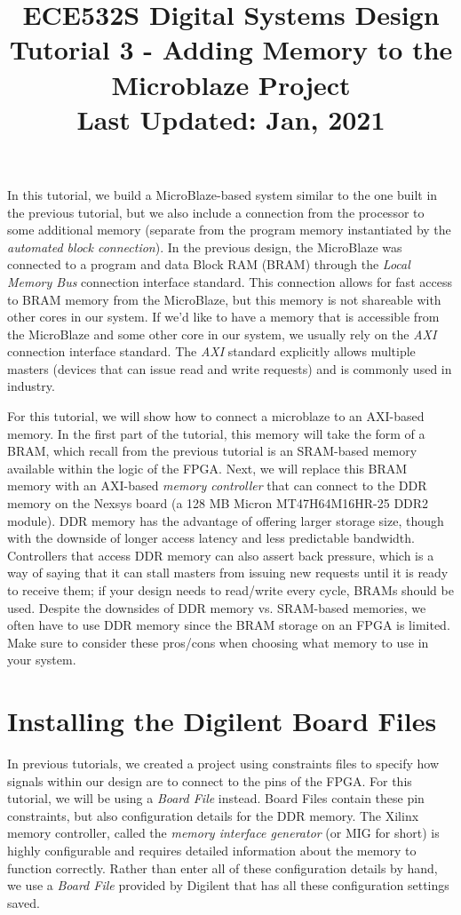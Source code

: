 \documentclass[11pt]{article}
\title{ECE532S Digital Systems Design \\ \vspace{0.4cm}
       \Large Tutorial 3 - Adding Memory to the Microblaze Project \\ \vspace{0.4cm}
       \small Last Updated: Jan, 2021}
\author{ }
\date{ }
\begin{document}
\maketitle
\vspace{-1cm}

In this tutorial, we build a MicroBlaze-based system similar to the one built in the previous tutorial, but we also include a connection from the processor to some additional memory (separate from the program memory instantiated by the \textit{automated block connection}). In the previous design, the MicroBlaze was connected to a program and data Block RAM (BRAM) through the \textit{Local Memory Bus} connection interface standard. This connection allows for fast access to BRAM memory from the MicroBlaze, but this memory is not shareable with other cores in our system. If we'd like to have a memory that is accessible from the MicroBlaze and some other core in our system, we usually rely on the \textit{AXI} connection interface standard. The \textit{AXI} standard explicitly allows multiple masters (devices that can issue read and write requests) and is commonly used in industry.

For this tutorial, we will show how to connect a microblaze to an AXI-based memory. In the first part of the tutorial, this memory will take the form of a BRAM, which recall from the previous tutorial is an SRAM-based memory available within the logic of the FPGA. Next, we will replace this BRAM memory with an AXI-based \textit{memory controller} that can connect to the DDR memory on the Nexsys board (a 128 MB Micron MT47H64M16HR-25 DDR2 module). DDR memory has the advantage of offering larger storage size, though with the downside of longer access latency and less predictable bandwidth. Controllers that access DDR memory can also assert back pressure, which is a way of saying that it can stall masters from issuing new requests until it is ready to receive them; if your design needs to read/write every cycle, BRAMs should be used. Despite the downsides of DDR memory vs. SRAM-based memories, we often have to use DDR memory since the BRAM storage on an FPGA is limited. Make sure to consider these pros/cons when choosing what memory to use in your system.




\section{Installing the Digilent Board Files}
\label{sec:board_file}
In previous tutorials, we created a project using constraints files to specify how signals within our design are to connect to the pins of the FPGA. For this tutorial, we will be using a \textit{Board File} instead. Board Files contain these pin constraints, but also configuration details for the DDR memory. The Xilinx memory controller, called the \textit{memory interface generator} (or MIG for short) is highly configurable and requires detailed information about the memory to function correctly. Rather than enter all of these configuration details by hand, we use a \textit{Board File} provided by Digilent that has all these configuration settings saved.
\end{document}
